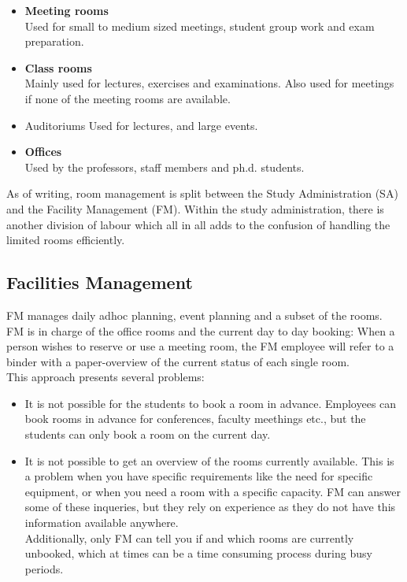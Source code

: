 \begin{itemize}
	\item \textbf{Meeting rooms}\\
	Used for small to medium sized meetings, student group work and exam preparation. 
	\item \textbf{Class rooms}\\
	Mainly used for lectures, exercises and examinations. Also used for meetings if none of the meeting rooms are available.
	\item Auditoriums
	Used for lectures, and large events.
	\item \textbf{Offices}\\
	Used by the professors, staff members and ph.d. students.
\end{itemize}

As of writing, room management is split between the Study Administration (SA) and the Facility Management (FM). Within the study administration, there is another division of labour which all in all adds to the confusion of handling the limited rooms efficiently.

\subsection{Facilities Management}
FM manages daily adhoc planning, event planning and a subset of the rooms. FM is in charge of the office rooms and the current day to day booking: When a person wishes to reserve or use a meeting room, the FM employee will refer to a binder with a paper-overview of the current status of each single room.\\

This approach presents several problems:
\begin{itemize}
	\item It is not possible for the students to book a room in advance. Employees can book rooms in advance for conferences, faculty meethings etc., but the students can only book a room on the current day.
	\item It is not possible to get an overview of the rooms currently available. This is a problem when you have specific requirements like the need for specific equipment, or when you need a room with a specific capacity. FM can answer some of these inqueries, but they rely on experience as they do not have this information available anywhere.\\ Additionally, only FM can tell you if and which rooms are currently unbooked, which at times can be a time consuming process during busy periods.
\end{itemize}

